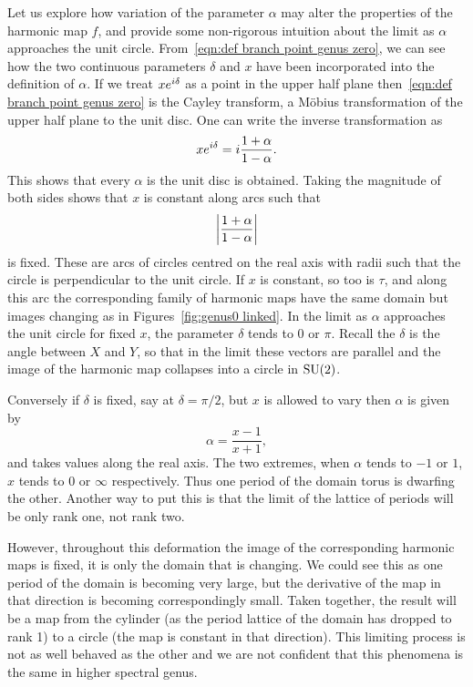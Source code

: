 \documentclass{article}
\begin{document}
Let us explore how variation of the parameter $\alpha$ may alter the properties of the harmonic map $f$, and provide some non-rigorous intuition about the limit as $\alpha$ approaches the unit circle. From~\eqref{eqn:def branch point genus zero}, we can see how the two continuous parameters $\delta$ and $x$ have been incorporated into the definition of $\alpha$. If we treat $xe^{i \delta}$ as a point in the upper half plane then~\eqref{eqn:def branch point genus zero} is the Cayley transform, a M\"obius transformation of the upper half plane to the unit disc. One can write the inverse transformation as
\[
x e^{i \delta} = i \frac{1+\alpha}{1-\alpha}.
\]
This shows that every $\alpha$ is the unit disc is obtained. Taking the magnitude of both sides shows that $x$ is constant along arcs such that
\[
\left|\frac{1+\alpha}{1-\alpha}\right|
\]
is fixed. 
These are arcs of circles centred on the real axis with radii such that the circle is perpendicular to the unit circle. 
If $x$ is constant, so too is $\tau$, and along this arc the corresponding family of harmonic maps have the same domain but images changing as in Figures~\ref{fig:genus0 linked}.
In the limit as $\alpha$ approaches the unit circle for fixed $x$, the parameter $\delta$ tends to $0$ or $\pi$. Recall the $\delta$ is the angle between $X$ and $Y$, so that in the limit these vectors are parallel and the image of the harmonic map collapses into a circle in $\mathrm{SU}(2)$.

Conversely if $\delta$ is fixed, say at $\delta=\pi/2$, but $x$ is allowed to vary then $\alpha$ is given by
\[
\alpha = \frac{x-1}{x+1},
\]
and takes values along the real axis. The two extremes, when $\alpha$ tends to $-1$ or $1$, $x$ tends to $0$ or $\infty$ respectively. Thus one period of the domain torus is dwarfing the other. Another way to put this is that the limit of the lattice of periods will be only rank one, not rank two. 

However, throughout this deformation the image of the corresponding harmonic maps is fixed, it is only the domain that is changing. We could see this as one period of the domain is becoming very large, but the derivative of the map in that direction is becoming correspondingly small. Taken together, the result will be a map from the cylinder (as the period lattice of the domain has dropped to rank 1) to a circle (the map is constant in that direction). This limiting process is not as well behaved as the other and we are not confident that this phenomena is the same in higher spectral genus.
\end{document}
